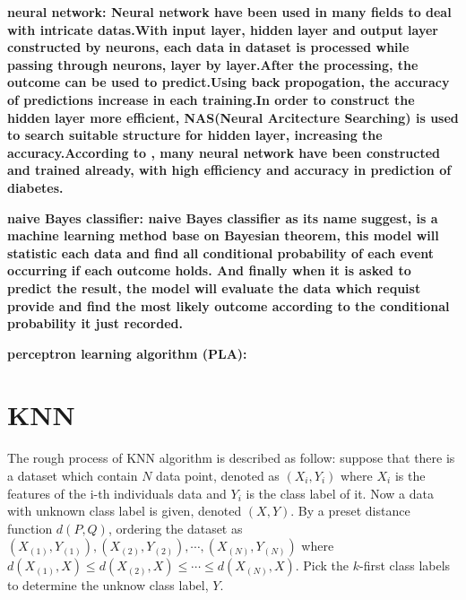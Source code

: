 \documentclass[twocolumn,10pt]{article}
\begin{document}
  \bf{neural network}: \rm{Neural} network have been used in many fields to deal with intricate datas.With input layer, hidden layer and output layer constructed by neurons, each data in dataset is processed while passing through neurons, layer by layer.After the processing, the outcome can be used to predict.Using back propogation, the accuracy of predictions increase in each training.In order to construct the hidden layer more efficient, NAS(Neural Arcitecture Searching) is used to search suitable structure for hidden layer, increasing the accuracy.According to \cite{Gadekallu2020}\cite{Beghriche2021}, many neural network have been constructed and trained already, with high efficiency and accuracy in prediction of diabetes.

  \bf{naive Bayes classifier}: \rm{naive Bayes classifier} as its name suggest, is a machine learning method base on Bayesian theorem, this model will statistic each data and find all conditional probability of each event occurring if each outcome holds. And finally when it is asked to predict the result, the model will evaluate the data which requist provide and find the most likely outcome according to the conditional probability it just recorded. 

  \bf{perceptron learning algorithm (PLA)}: 

\section{KNN}
  \rm{The} rough process of KNN algorithm is described as follow: suppose that there is a dataset which contain $N$ data point, denoted as 
  $(X_i,Y_i)$ where $X_i$ is the features of the i-th individuals data and $Y_i$ is the class label of it. Now 
  a data with unknown class label is given, denoted $(X, Y)$. By a preset distance function $d(P, Q)$, ordering the dataset 
  as $(X_{(1)}, Y_{(1)}), (X_{(2)}, Y_{(2)}), \cdots, (X_{(N)}, Y_{(N)})$ where $d(X_{(1)}, X)\leq d(X_{(2)}, X)\leq\cdots\leq d(X_{(N)}, X)$. 
  Pick the $k$-first class labels to determine the unknow class label, $Y$.
\end{document}
